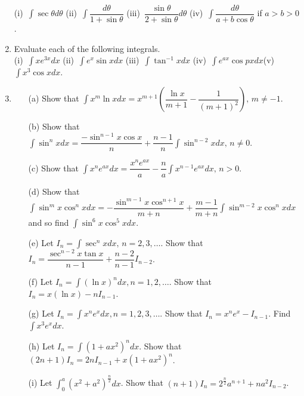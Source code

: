 \documentclass[titlepage,a4paper,12pt]{report}
\begin{document}
\begin{enumerate}
(i)\, $\displaystyle \int \sec \theta d\theta$ \quad (ii)\, $\displaystyle \int \dfrac{d\theta}{1+\sin \theta}$ \quad (iii)\, $\displaystyle \dfrac{\sin \theta}{2+\sin \theta}d\theta$ \quad (iv)\, $\displaystyle \int \dfrac{d\theta}{a+b\cos \theta}$ if $a>b>0$.
\item Evaluate each of the following integrals.\\
(i)\, $\displaystyle \int xe^{3x}dx$ \quad (ii)\, $\displaystyle \int e^x\sin x dx$ \quad (iii)\, $\displaystyle \int \tan ^{-1} x dx$ \quad (iv)\, $\displaystyle \int e^{ax}\cos px dx $\quad (v)\, $\displaystyle \int x^3\cos x dx$.
\item 
\begin{itemize}
\item[(a)] Show that $\displaystyle \int x^m \ln x dx=x^{m+1}\left(\dfrac{\ln x}{m+1}-\dfrac{1}{(m+1)^2} \right), \, m \neq -1$.
\item[(b)] Show that $\displaystyle \int \sin ^n x dx=\dfrac{-\sin ^{n-1}x \cos x}{n}+\dfrac{n-1}{n}\int \sin ^{n-2}x dx, \, n\neq 0$.
\item[(c)] Show that $\displaystyle \int x^n e^{ax}dx=\dfrac{x^ne^{ax}}{a}-\dfrac{n}{a}\int x^{n-1}e^{ax}dx, \, n>0$.
\item[(d)] Show that $\displaystyle \int \sin ^m x \cos ^n x dx=-\dfrac{\sin ^{m-1}x \cos ^{n+1}x}{m+n}+\dfrac{m-1}{m+n}\int \sin ^{m-2} x \cos ^n xdx$ and so find $\displaystyle \int \sin ^6x \cos ^5 x dx$.
\item[(e)] Let $I_n=\displaystyle \int \sec ^n x dx, \, n=2,3,\dots$. Show that $I_n=\dfrac{\sec ^{n-2}x \tan x}{n-1}+\dfrac{n-2}{n-1}I_{n-2}$.
\item[(f)] Let $I_n=\displaystyle \int (\ln x)^n dx, n=1,2,\dots$. Show that $I_n=x(\ln x)-nI_{n-1}$.
\item[(g)] Let $\displaystyle I_n=\int x^ne^xdx, n=1,2,3,\dots$. Show that $I_n=x^ne^x-I_{n-1}$. Find $\displaystyle \int x^3e^xdx$.
\item[(h)] Let $I_n=\displaystyle \int (1+ax^2)^n dx$. Show that $(2n+1)I_n=2nI_{n-1}+x(1+ax^2)^n$.
\item[(i)] Let $\displaystyle \int _{0}^a (x^2+a^2)^{\frac{n}{2}}dx$. Show that $(n+1)I_n=2^{\frac{n}{2}}a^{n+1}+na^2I_{n-2}$.
\end{itemize}
\end{enumerate}
\end{document}
